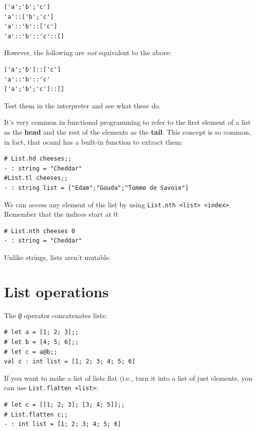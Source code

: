 \documentclass[10pt]{book}
\begin{document}

\beforeverb
\begin{verbatim}
['a';'b';'c']
'a'::['b';'c']
'a'::'b'::['c']
'a'::'b'::'c'::[]
\end{verbatim}
\afterverb
However, the following are {\it not} equivalent to the above:
\beforeverb
\begin{verbatim}
['a';'b']::['c']
'a'::'b'::'c'
['a';'b';'c']::[]
\end{verbatim}
\afterverb
Test them in the interpreter and see what these do.

It's very common in functional programming to refer to the first element 
of a list as the {\bf head} and the rest of the elements as the {\bf tail}. This
concept is so common, in fact, that ocaml has a built-in function to extract them:

\beforeverb
\begin{verbatim}
# List.hd cheeses;;
- : string = "Cheddar"
#List.tl cheeses;;
- : string list = ["Edam";"Gouda";"Tomme de Savoie"]
\end{verbatim}
\afterverb


We can access any element of the list by using {\tt List.nth <list> <index>}. 
Remember that the indices start at 0:

\beforeverb
\begin{verbatim}
# List.nth cheeses 0
- : string = "Cheddar"
\end{verbatim}
\afterverb
%
Unlike strings, lists aren't mutable.

\section{List operations}

The {\tt @} operator concatenates lists:


\beforeverb
\begin{verbatim}
# let a = [1; 2; 3];;
# let b = [4; 5; 6];;
# let c = a@b;;
val c : int list = [1; 2; 3; 4; 5; 6]
\end{verbatim}
\afterverb
%

If you want to make a list of lists flat (i.e., turn it into a list of 
just elements, you can use {\tt List.flatten <list>}:

\beforeverb
\begin{verbatim}
# let c = [[1; 2; 3]; [3; 4; 5]];;
# List.flatten c;;
- : int list = [1; 2; 3; 4; 5; 6]
\end{verbatim}
\afterverb
\end{document}
